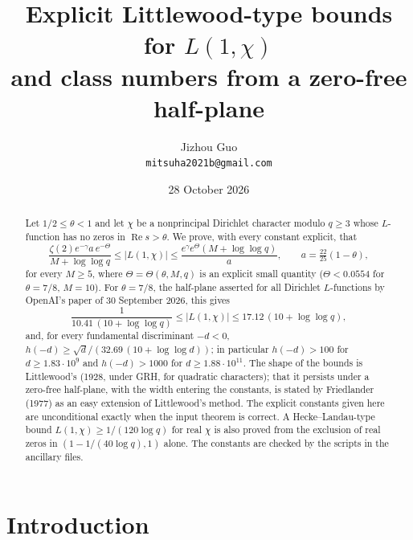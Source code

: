 \documentclass[11pt]{article}
\title{Explicit Littlewood-type bounds for $L(1,\chi)$\protect\\and class numbers from a zero-free half-plane}
\author{Jizhou Guo\\\texttt{mitsuha2021b@gmail.com}}
\date{28 October 2026}
\theoremstyle{definition}
\theoremstyle{remark}
\numberwithin{equation}{section}
\newcommand{\Rea}{\operatorname{Re}}
\begin{document}
\maketitle

\begin{abstract}
Let $1/2\le\theta<1$ and let $\chi$ be a nonprincipal Dirichlet character modulo $q\ge3$ whose $L$-function has no zeros in $\Rea s>\theta$. We prove, with every constant explicit, that
\[
 \frac{\zeta(2)e^{-\gamma}a\,e^{-\Theta}}{M+\log\log q}\le|L(1,\chi)|\le\frac{e^{\gamma}e^{\Theta}(M+\log\log q)}{a},\qquad a=\tfrac{22}{25}(1-\theta),
\]
for every $M\ge5$, where $\Theta=\Theta(\theta,M,q)$ is an explicit small quantity ($\Theta<0.0554$ for $\theta=7/8$, $M=10$). For $\theta=7/8$, the half-plane asserted for all Dirichlet $L$-functions by OpenAI's paper of 30 September 2026, this gives
\[
 \frac{1}{10.41\,(10+\log\log q)}\le|L(1,\chi)|\le17.12\,(10+\log\log q),
\]
and, for every fundamental discriminant $-d<0$, $h(-d)\ge\sqrt d/(32.69\,(10+\log\log d))$; in particular $h(-d)>100$ for $d\ge1.83\cdot10^{9}$ and $h(-d)>1000$ for $d\ge1.88\cdot10^{11}$. The shape of the bounds is Littlewood's (1928, under GRH, for quadratic characters); that it persists under a zero-free half-plane, with the width entering the constants, is stated by Friedlander (1977) as an easy extension of Littlewood's method. The explicit constants given here are unconditional exactly when the input theorem is correct. A Hecke--Landau-type bound $L(1,\chi)\ge1/(120\log q)$ for real $\chi$ is also proved from the exclusion of real zeros in $(1-1/(40\log q),1)$ alone. The constants are checked by the scripts in the ancillary files.
\end{abstract}

\section{Introduction}\label{sec:intro}
\end{document}
